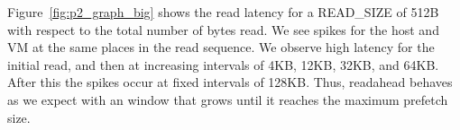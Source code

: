 Figure~\ref{fig:p2_graph_big} shows the read latency for a READ\_SIZE of 512B with
respect to the total number of bytes read. We see spikes for the host and VM at the same
places in the read sequence. We observe high latency for the initial read, and
then at increasing intervals of 4KB, 12KB, 32KB, and 64KB. After this the spikes occur
at fixed intervals of 128KB. Thus, readahead behaves as we expect with an window that
grows until it reaches the maximum prefetch size.




